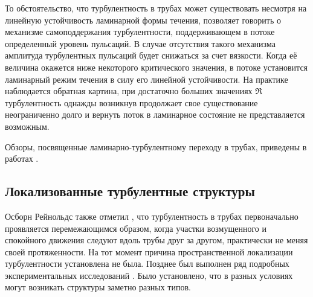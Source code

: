 То обстоятельство, что турбулентность в трубах может существовать несмотря на линейную устойчивость ламинарной формы течения, позволяет говорить о механизме самоподдержания турбулентности, поддерживающем в потоке определенный уровень пульсаций. В случае отсутствия такого механизма амплитуда турбулентных пульсаций будет снижаться за счет вязкости. Когда её величина окажется ниже некоторого критического значения, в потоке установится ламинарный режим течения в силу его линейной устойчивости. На практике наблюдается обратная картина, при достаточно больших значениях $\Re$ турбулентность однажды возникнув продолжает свое существование неограниченно долго и вернуть поток в ламинарное состояние не представляется возможным. 

Обзоры, посвященные ламинарно-турбулентному переходу в трубах, приведены в работах \cite{Kerswell2005, Manneville2016, Kreilos2014, Barkley2016}. 


	\subsection{Локализованные турбулентные структуры}

Осборн Рейнольдс также отметил \cite{Reynolds1883}, что турбулентность в трубах первоначально проявляется перемежающимся образом, когда участки возмущенного и спокойного движения следуют вдоль трубы друг за другом, практически не меняя своей протяженности. На тот момент причина пространственной локализации турбулентности установлена не была. Позднее был выполнен ряд подробных экспериментальных исследований \cite{Lindgren1969, Wygnanski1973, Wygnanski1975, Bandyopadhyay1986, Darbyshire1995, vanDoorne2009}. 
Было установлено, что в разных условиях могут возникать структуры заметно разных типов.

